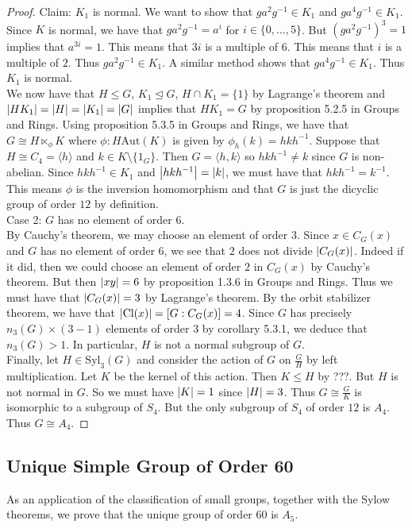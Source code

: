 \documentclass[a4paper]{article}
\begin{document}
\begin{thm}{}{}
\begin{proof}
Claim: $K_1$ is normal. We want to show that $ga^2g^{-1}\in K_1$ and $ga^4g^{-1}\in K_1$. Since $K$ is normal, we have that $ga^2g^{-1}=a^i$ for $i\in\{0,\dots,5\}$. But $(ga^2g^{-1})^3=1$ implies that $a^{3i}=1$. This means that $3i$ is a multiple of $6$. This means that $i$ is a multiple of $2$. Thus $ga^2g^{-1}\in K_1$. A similar method shows that $ga^4g^{-1}\in K_1$. Thus $K_1$ is normal. \\

We now have that $H\leq G$, $K_1\trianglelefteq G$, $H\cap K_1=\{1\}$ by Lagrange's theorem and $\abs{HK_1}=\abs{H}=\abs{K_1}=\abs{G}$ implies that $HK_1=G$ by proposition 5.2.5 in Groups and Rings. Using proposition 5.3.5 in Groups and Rings, we have that $G\cong H\ltimes_\phi K$ where $\phi:H\text{Aut}(K)$ is given by $\phi_h(k)=hkh^{-1}$. Suppose that $H\cong C_4=\langle h\rangle$ and $k\in K\setminus\{1_G\}$. Then $G=\langle h,k\rangle$ so $hkh^{-1}\neq k$ since $G$ is non-abelian. Since $hkh^{-1}\in K_1$ and $\abs{hkh^{-1}}=\abs{k}$, we must have that $hkh^{-1}=k^{-1}$. This means $\phi$ is the inversion homomorphism and that $G$ is just the dicyclic group of order $12$ by definition. \\

Case 2: $G$ has no element of order $6$. \\
By Cauchy's theorem, we may choose an element of order $3$. Since $x\in C_G(x)$ and $G$ has no element of order $6$, we see that $2$ does not divide $\abs{C_G(x)}$. Indeed if it did, then we could choose an element of order $2$ in $C_G(x)$ by Cauchy's theorem. But then $\abs{xy}=6$ by proposition 1.3.6 in Groups and Rings. Thus we must have that $\abs{C_G(x)}=3$ by Lagrange's theorem. By the orbit stabilizer theorem, we have that $\abs{\text{Cl}(x)}=[G:C_G(x)]=4$. Since $G$ has precisely $n_3(G)\times(3-1)$ elements of order $3$ by corollary 5.3.1, we deduce that $n_3(G)>1$. In particular, $H$ is not a normal subgroup of $G$. \\

Finally, let $H\in\text{Syl}_3(G)$ and consider the action of $G$ on $\frac{G}{H}$ by left multiplication. Let $K$ be the kernel of this action. Then $K\leq H$ by ???. But $H$ is not normal in $G$. So we must have $\abs{K}=1$ since $\abs{H}=3$. Thus $G\cong\frac{G}{K}$ is isomorphic to a subgroup of $S_4$. But the only subgroup of $S_4$ of order $12$ is $A_4$. Thus $G\cong A_4$. 
\end{proof}
\end{thm}

\subsection{Unique Simple Group of Order 60}
As an application of the classification of small groups, together with the Sylow theorems, we prove that the unique group of order $60$ is $A_5$. 
\end{document}
